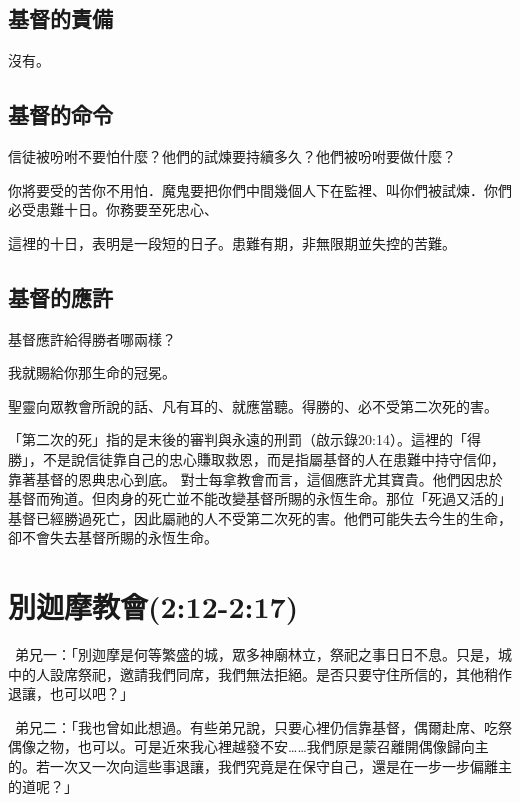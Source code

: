 \subsection{基督的責備}

沒有。

\subsection{基督的命令}

\begin{ScriptureBox2}{信徒被吩咐不要怕什麼？他們的試煉要持續多久？他們被吩咐要做什麼？}

\item[2:10a] 你將要受的苦你不用怕．魔鬼要把你們中間幾個人下在監裡、叫你們被試煉．你們必受患難十日。你務要至死忠心、

\end{ScriptureBox2}

這裡的十日，表明是一段短的日子。患難有期，非無限期並失控的苦難。

\subsection{基督的應許}

\begin{ScriptureBox2}{基督應許給得勝者哪兩樣？}

\item[2:10b] 我就賜給你那生命的冠冕。

\item[2:11] 聖靈向眾教會所說的話、凡有耳的、就應當聽。得勝的、必不受第二次死的害。

\end{ScriptureBox2}

「第二次的死」指的是末後的審判與永遠的刑罰（啟示錄20:14）。這裡的「得勝」，不是說信徒靠自己的忠心賺取救恩，而是指屬基督的人在患難中持守信仰，靠著基督的恩典忠心到底。
對士每拿教會而言，這個應許尤其寶貴。他們因忠於基督而殉道。但肉身的死亡並不能改變基督所賜的永恆生命。那位「死過又活的」基督已經勝過死亡，因此屬祂的人不受第二次死的害。他們可能失去今生的生命，卻不會失去基督所賜的永恆生命。

\section{別迦摩教會(2:12-2:17)}

\begin{DialogueBox}
\noindent\faUser\ 弟兄一：「別迦摩是何等繁盛的城，眾多神廟林立，祭祀之事日日不息。只是，城中的人設席祭祀，邀請我們同席，我們無法拒絕。是否只要守住所信的，其他稍作退讓，也可以吧？」

\noindent\faUser\ 弟兄二：「我也曾如此想過。有些弟兄說，只要心裡仍信靠基督，偶爾赴席、吃祭偶像之物，也可以。可是近來我心裡越發不安……我們原是蒙召離開偶像歸向主的。若一次又一次向這些事退讓，我們究竟是在保守自己，還是在一步一步偏離主的道呢？」
\end{DialogueBox}


